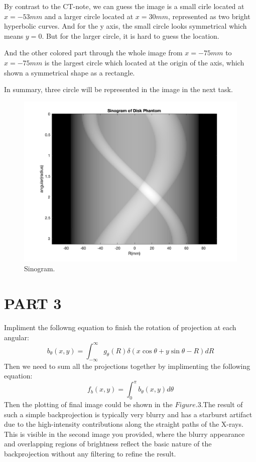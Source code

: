 \documentclass{report}
\begin{document}
By contrast to the CT-note, we can guess the image is a small cirle located at 
$x = -53mm$ and a larger circle located at $x = 30mm$, represented as two bright 
hyperbolic curves. And for the y axis, the small circle looks symmetrical which means $y = 0$. 
But for the larger circle, it is hard to guess the location.\vspace{\baselineskip}

And the other colored part through the whole image from $x = -75mm$ to $x = -75mm$
is the largest circle which located at the origin of the axis, which shown a symmetrical
shape as a rectangle.\vspace{\baselineskip}

In summary, three circle will be represented in the image in the next task.

\begin{figure}[hb]
    \centering
    \includegraphics[width=1\textwidth]{2.png}
    \caption{Sinogram.}
\end{figure}  
\newpage
\section[short]{PART 3}
Impliment the followng equation to finish the rotation of projection at each angular:
\[
b_{\theta}(x, y) = \int_{-\infty}^{\infty} g_{\theta}(R)\delta(x\cos\theta + y\sin\theta - R)dR
\]
Then we need to sum all the projections together by implimenting the following equation:
\[
f_b(x,y) = \int_{0}^{\pi} b_{\theta}(x, y)d\theta
\]
Then the plotting of final image could be shown in the $Figure.3$.The result of
such a simple backprojection is typically very blurry and has a starburst artifact
due to the high-intensity contributions along the straight paths of the X-rays.
This is visible in the second image you provided, where the blurry appearance and
overlapping regions of brightness reflect the basic nature of the backprojection
without any filtering to refine the result.
\end{document}
